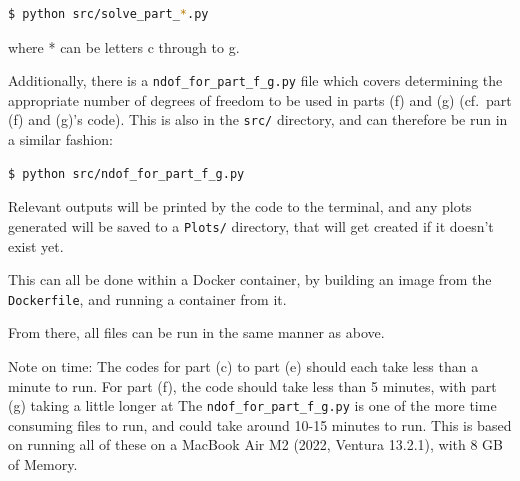 \documentclass[12pt]{report} %
\begin{document}
\vspace*{1\baselineskip}
\begin{lstlisting}[language=bash, caption={Running the code for each part}]
    $ python src/solve_part_*.py
\end{lstlisting}

where * can be letters c through to g.  

Additionally, there is a \texttt{ndof\_for\_part\_f\_g.py} file which covers determining the appropriate number of degrees of freedom to be used in parts (f) and (g) (cf.\ part (f) and (g)'s code). This is also in the \texttt{src/} directory, and can therefore be run in a similar fashion:  

\vspace*{1\baselineskip}
\begin{lstlisting}[language=bash, caption={Running the number of DoF fitting code}]
    $ python src/ndof_for_part_f_g.py
\end{lstlisting}

Relevant outputs will be printed by the code to the terminal, and any plots generated will be saved to a \texttt{Plots/} directory, that will get created if it doesn't exist yet.

This can all be done within a Docker container, by building an image from the \texttt{Dockerfile}, and running a container from it. 

From there, all files can be run in the same manner as above.


Note on time: The codes for part (c) to part (e) should each take less than a minute to run. For part (f), the code should take less than 5 minutes, with part (g) taking a little longer at The \texttt{ndof\_for\_part\_f\_g.py} is one of the more time consuming files to run, and could take around 10-15 minutes to run. This is based on running all of these on a MacBook Air M2 (2022, Ventura 13.2.1), with 8 GB of Memory.
\end{document}
